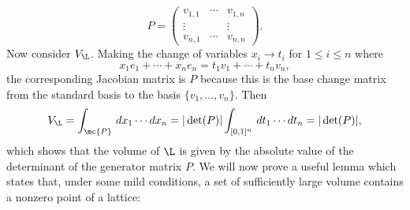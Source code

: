     \[
      P = \begin{pmatrix} v_{1,1} & \cdots & v_{1,n} \\ \vdots & & \vdots \\ v_{n,1} & \cdots & v_{n,n} \end{pmatrix}.
    \]
    Now consider $V_{\L}$. Making the change of variables $x_{i} \to t_{i}$ for $1 \le i \le n$ where
    \[
      x_{1}e_{1}+\cdots+x_{n}e_{n} = t_{1}v_{1}+\cdots+t_{n}v_{n},
    \]
    the corresponding Jacobian matrix is $P$ because this is the base change matrix from the standard basis to the basis $\{v_{1},\ldots,v_{n}\}$. Then
    \[
      V_{\L} = \int_{\mc{P}}\,dx_{1} \cdots dx_{n} = |\det(P)|\int_{[0,1]^{n}}\,dt_{1} \cdots dt_{n} = |\det(P)|,
    \]
    which shows that the volume of $\L$ is given by the absolute value of the determinant of the generator matrix $P$. We will now prove a useful lemma which states that, under some mild conditions, a set of sufficiently large volume contains a nonzero point of a lattice:

